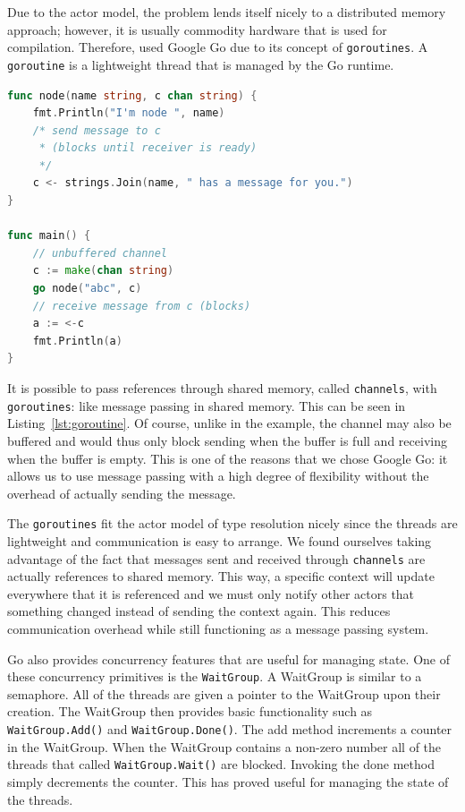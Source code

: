 \documentclass{acm_proc_article-sp}
\begin{document}

Due to the actor model, the problem lends itself nicely to a distributed memory
approach; however, it is usually commodity hardware that is used for
compilation. Therefore, used Google Go due to its concept of
\texttt{goroutines}. A \texttt{goroutine} is a lightweight thread that is
managed by the Go runtime.

\begin{lstlisting}[caption=Small \texttt{goroutine} example with
\texttt{channels},language=Go,label=lst:goroutine]
func node(name string, c chan string) {
	fmt.Println("I'm node ", name)
	/* send message to c
	 * (blocks until receiver is ready)
	 */
	c <- strings.Join(name, " has a message for you.")
}

func main() {
	// unbuffered channel
	c := make(chan string)
	go node("abc", c)
	// receive message from c (blocks)
	a := <-c
	fmt.Println(a)
}
\end{lstlisting}

It is possible to pass references through shared memory, called
\texttt{channels}, with \texttt{goroutines}: like message passing in shared
memory. This can be seen in Listing~\ref{lst:goroutine}. Of course, unlike in
the example, the channel may also be buffered and would thus only block sending
when the buffer is full and receiving when the buffer is empty. This is one of
the reasons that we chose Google Go: it allows us to use message passing
with a high degree of flexibility without the overhead of actually sending the message.


The \texttt{goroutines} fit the actor model of type resolution nicely since
the threads are lightweight and communication is easy to arrange. We found ourselves taking advantage of the fact that messages sent and received through \texttt{channels} are actually references to shared memory. This way, a specific context will update everywhere that it
is referenced and we must only notify other actors that something changed
instead of sending the context again. This reduces communication overhead while
still functioning as a message passing system.

Go also provides concurrency features that are useful for managing state. One of these concurrency primitives is the \texttt{WaitGroup}. A WaitGroup is similar to a semaphore. All of the threads are given a pointer to the WaitGroup upon their creation. The WaitGroup then provides basic functionality such as \lstinline!WaitGroup.Add()! and \lstinline!WaitGroup.Done()!. The add method increments a counter in the WaitGroup. When the WaitGroup contains a non-zero number all of the threads that called \lstinline!WaitGroup.Wait()! are blocked. Invoking the done method simply decrements the counter. This has proved useful for managing the state of the threads.
\end{document}
